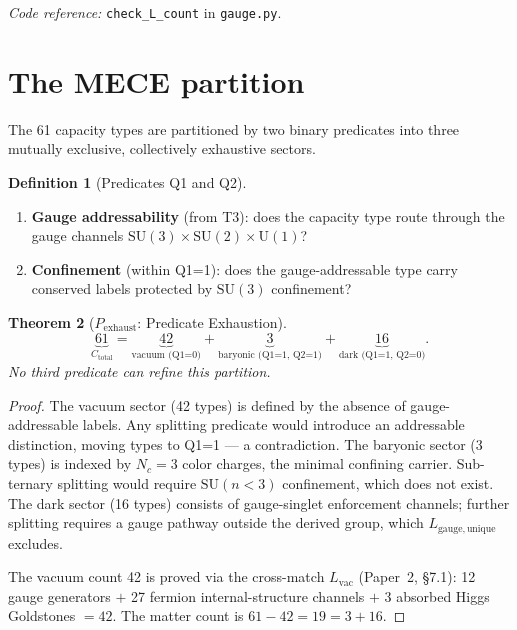 \documentclass[11pt,a4paper]{article}
\newtheorem{theorem}{Theorem}[section]
\theoremstyle{definition}
\newtheorem{definition}[theorem]{Definition}
\newcommand{\SU}{\mathrm{SU}}
\newcommand{\U}{\mathrm{U}}
\newcommand{\coderef}[2]{\smallskip\noindent\textit{Code reference:} \texttt{#1} in \texttt{#2}.}
\begin{document}
\coderef{check\_L\_count}{gauge.py}


\section{The MECE partition}
\label{sec:mece}


The 61 capacity types are partitioned by two binary predicates into
three mutually exclusive, collectively exhaustive sectors.

\begin{definition}[Predicates Q1 and Q2]\label{def:Q1Q2}
\leavevmode
\begin{enumerate}[label=\textbf{Q\arabic*},nosep,leftmargin=3em]
  \item \textbf{Gauge addressability} (from T3): does the capacity type
  route through the gauge channels $\SU(3) \times \SU(2) \times \U(1)$?
  \item \textbf{Confinement} (within Q1=1): does the gauge-addressable
  type carry conserved labels protected by $\SU(3)$ confinement?
\end{enumerate}
\end{definition}

\begin{theorem}[$P_{\mathrm{exhaust}}$: Predicate Exhaustion]\label{thm:Pexhaust}
\[
  \underbrace{61}_{C_{\mathrm{total}}}
  = \underbrace{42}_{\text{vacuum (Q1=0)}}
  + \underbrace{3}_{\text{baryonic (Q1=1, Q2=1)}}
  + \underbrace{16}_{\text{dark (Q1=1, Q2=0)}}.
\]
No third predicate can refine this partition.
\end{theorem}

\begin{proof}
The vacuum sector (42 types) is defined by the absence of
gauge-addressable labels.  Any splitting predicate would introduce an
addressable distinction, moving types to Q1=1 --- a contradiction.
The baryonic sector (3 types) is indexed by $N_c = 3$ color charges,
the minimal confining carrier.  Sub-ternary splitting would require
$\SU(n < 3)$ confinement, which does not exist.  The dark sector
(16 types) consists of gauge-singlet enforcement channels; further
splitting requires a gauge pathway outside the derived group, which
$L_{\mathrm{gauge,unique}}$ excludes.

The vacuum count 42 is proved via the cross-match $L_{\mathrm{vac}}$
(Paper~2, \S7.1): 12 gauge generators $+$ 27 fermion
internal-structure channels $+$ 3 absorbed Higgs Goldstones $= 42$.
The matter count is $61 - 42 = 19 = 3 + 16$.
\end{proof}
\end{document}
